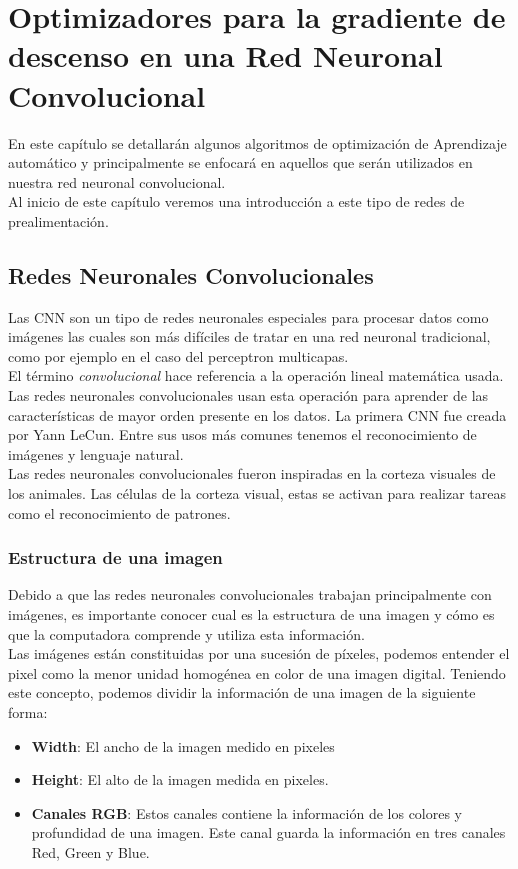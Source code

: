 \chapter{Optimizadores para la gradiente de descenso en una Red Neuronal Convolucional}
En este capítulo se detallarán algunos algoritmos de optimización de Aprendizaje automático y principalmente se enfocará en aquellos que serán utilizados en nuestra red neuronal convolucional.\\
Al inicio de este capítulo veremos una introducción a este tipo de redes de prealimentación.

\section{Redes Neuronales Convolucionales}
Las CNN son un tipo de redes neuronales especiales para procesar datos como imágenes las cuales son más difíciles de tratar en una red neuronal tradicional, como por ejemplo en el caso del perceptron multicapas.\\ El término \textit{convolucional} hace referencia a la operación lineal matemática usada. Las redes neuronales convolucionales usan esta operación para aprender de las características de mayor orden presente en los datos.
La primera CNN fue creada por Yann LeCun. Entre sus usos más comunes tenemos el reconocimiento de imágenes y lenguaje natural.\\
Las redes neuronales convolucionales fueron inspiradas en la corteza visuales de los animales. Las células de la corteza visual, estas se activan para realizar tareas como el reconocimiento de patrones.

\subsection{Estructura de una imagen}
Debido a que las redes neuronales convolucionales trabajan principalmente con imágenes, es importante conocer cual es la estructura de una imagen y cómo es que la computadora comprende y utiliza esta información.\\
Las imágenes están constituidas por una sucesión de píxeles, podemos entender el pixel como la menor unidad homogénea en color de una imagen digital. Teniendo este concepto, podemos dividir la información de una imagen de la siguiente forma:
\begin{itemize}
	\item \textbf{Width}: El ancho de la imagen medido en pixeles
	\item \textbf{Height}: El alto de la imagen medida en pixeles.
	\item \textbf{Canales RGB}: Estos canales contiene la información de los colores y profundidad de una imagen. Este canal guarda la información en tres canales Red, Green y Blue.
\end{itemize}

